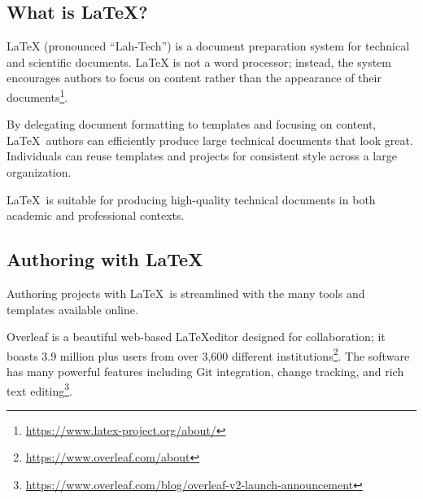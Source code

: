 
\subsection{What is \LaTeX?}
LaTeX (pronounced \enquote{Lah-Tech}) is a document preparation system for technical and scientiﬁc documents. LaTeX is not a word processor; instead, the system encourages authors to focus on content rather than the appearance of their documents\footnote{\url{https://www.latex-project.org/about/}}. 

\begin{minipage}{\linewidth}
\end{minipage}

By delegating document formatting to templates and focusing on content, \LaTeX\ authors can efficiently produce large technical documents that look great. Individuals can reuse templates and projects for consistent style across a large organization.
\par
\LaTeX\ is suitable for producing high-quality technical documents in both academic and professional contexts.

\subsection{Authoring with \LaTeX}
Authoring projects with \LaTeX\ is streamlined with the many tools and templates available online.
\par
Overleaf is a beautiful web-based \LaTeX editor designed for collaboration; it boasts 3.9 million plus users from over 3,600 diﬀerent institutions\footnote{\url{https://www.overleaf.com/about}}.
The software has many powerful features including Git integration, change tracking, and rich text editing\footnote{\url{https://www.overleaf.com/blog/overleaf-v2-launch-announcement}}.

